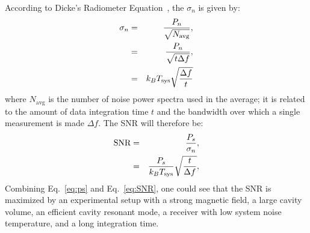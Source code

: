 According to Dicke's Radiometer Equation~\cite{Dicke}, the $\sigma_n$ 
is given by: 
\begin{eqnarray}
 \sigma_n  &=&  \frac{P_n}{\sqrt{N_\text{avg}}}, \nonumber \\
           &=&  \frac{P_n}{\sqrt{t\Delta f}}, \nonumber \\
           &=&  k_BT_\text{sys}\sqrt{\frac{\Delta f}{t}} 
 \label{eq:sigman}
\end{eqnarray}
where $N_\text{avg}$ is the number of noise power spectra used in the 
average; it is related to the amount of data integration time $t$ 
and the bandwidth over which a single measurement is made $\Delta f$.  
The SNR will therefore be: 
\begin{eqnarray}
   \text{SNR} & = & \frac{P_s}{\sigma_n}, \nonumber \\
              & = & \frac{P_s}{k_BT_\text{sys}}\sqrt{\frac{t}{\Delta f}},
 \label{eq:SNR}
\end{eqnarray}  
Combining Eq.~\eqref{eq:ps} and Eq.~\eqref{eq:SNR},
one could see that the SNR is maximized by an experimental setup with 
a strong magnetic field, a large cavity volume, an efficient cavity 
resonant mode, a receiver with low system noise temperature, and a 
long integration time. 










